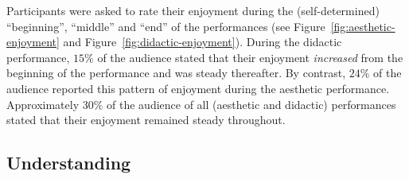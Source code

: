 Participants were asked to rate their enjoyment during the (self-determined) ``beginning'', ``middle'' and ``end'' of the performances (see Figure~\ref{fig:aesthetic-enjoyment} and Figure~\ref{fig:didactic-enjoyment}). During the didactic performance, $15\%$ of the audience stated that their enjoyment \emph{increased} from the beginning of the performance and was steady thereafter. By contrast, $24\%$ of the audience reported this pattern of enjoyment during the aesthetic performance. Approximately $30\%$ of the audience of all (aesthetic and didactic) performances stated that their enjoyment remained steady throughout.

\subsection{Understanding}


